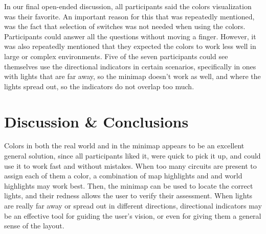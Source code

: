In our final open-ended discussion, all participants said the colors visualization was their favorite. An important reason for this that was repeatedly mentioned, was the fact that selection of switches was not needed when using the colors. Participants could answer all the questions without moving a finger. However, it was also repeatedly mentioned that they expected the colors to work less well in large or complex environments. Five of the seven participants could see themselves use the directional indicators in certain scenarios, specifically in ones with lights that are far away, so the minimap doesn't work as well, and where the lights spread out, so the indicators do not overlap too much.

\section{Discussion \& Conclusions} \label{sec:user:disc_conc}
Colors in both the real world and in the minimap appears to be an excellent general solution, since all participants liked it, were quick to pick it up, and could use it to work fast and without mistakes. When too many circuits are present to assign each of them a color, a combination of map highlights and and world highlights may work best. Then, the minimap can be used to locate the correct lights, and their redness allows the user to verify their assessment. When lights are really far away or spread out in different directions, directional indicators may be an effective tool for guiding the user's vision, or even for giving them a general sense of the layout.

